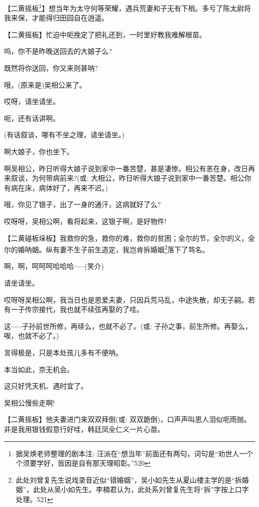 \setlength{\hangindent}{60pt} {【{\akai 二黄摇板}\footnote{ 据吴焕老师整理的剧本注: 汪派在``想当年''前面还有两句，词句是``劝世人一个个须要学好，皆因是自有那天理昭彰。''{520}}{】想当年为太守何等荣耀，遇兵荒妻和子无有下梢。多亏了陈太尉将我来保，才能得归田园自在逍遥。}

\setlength{\hangindent}{60pt} {【{\akai 二黄摇板}】忙迫中呃挽定了把礼还到，一时里好教我难解根苗。}

{呜，你不是昨晚送回去的大娘子么?}

{既然将你送回，你又来则甚呐?}

{哦，(原来是)吴相公来了。}

{哎呀，请坐请坐。}

{呃，还有话讲啊。}

{(有话叙谈，}哪有不坐之理，请坐请坐。{)}

{啊大娘子，你也坐下。}

{啊吴相公，昨日听得大娘子说到家中一番苦楚，甚是凄惨。相公有恙在身，改日再来叙谈，为何带病前来?({\akai 或}: 大相公，昨日听得大娘子说到家中一番苦楚。相公你有病在床，病体好了，再来不迟。)}

{哦，你见了银子，出了一身的通汗，这病就好了么?}

{哎呀呀，吴相公啊，看将起来，这银子啊，是好物件!}

\setlength{\hangindent}{60pt} {【{\akai 二黄碰板垛板}】我救你的急，救你的难，救你的贫困；全尔的节，全尔的义，全尔的婚呐姻。纵有妻不生子前生造定，我岂肯拆婚姻}\footnote{ 此处刘曾复先生说戏录音近似``错婚姻''，吴小如先生从夏山楼主学的是``拆婚姻''，此处从吴小如先生。李楠君认为，此处系刘曾复先生将``拆''字按上口字处理。{521}}{落下了骂名。}

{啊，啊，呵呵呵哈哈哈$\cdots{}\cdots{}$(笑介)}

{请坐请坐。}

{哎呀呀吴相公啊，我当日也是恩爱夫妻，只因兵荒马乱，中途失散，却无子嗣。若有一子传宗接代，我也就不续弦再娶的了哇。}

{这$\cdots{}\cdots{}$子孙前世所修，再续么，也就不必了。({\akai 或}: }子孙之事，前生所修。再娶么，唉，也就不必了。{)}

{言得极是，只是本处孩儿多有不便呐。}

{本当如此，奈无机会。}

{这只好凭天机、遇时宜了。}

{吴相公慢些走啊!}

\setlength{\hangindent}{60pt} {【{\akai 二黄摇板}】他夫妻进门来双双拜倒({\akai 或}: 双双跪倒)，口声声叫恩人泪似呃雨抛。非是我用银钱假意行好哇，韩廷凤全仁义一片心苗。}

}

